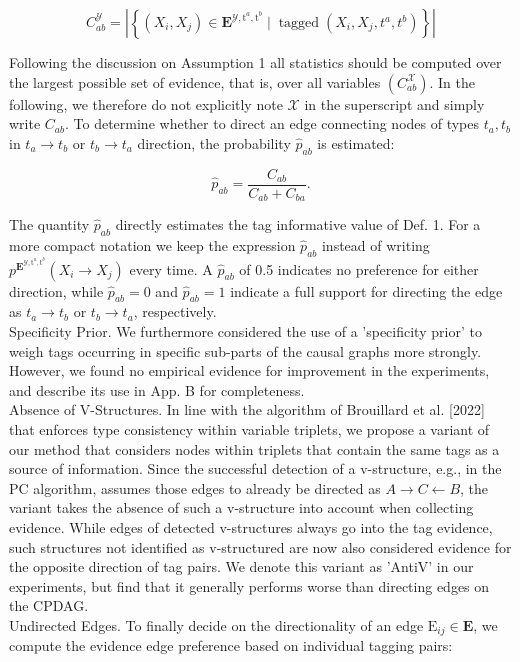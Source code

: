 \documentclass[10pt]{article}
\begin{document}
\begin{equation*}
C_{a b}^{\mathcal{Y}}=\left|\left\{\left(X_{i}, X_{j}\right) \in \mathbf{E}^{\mathcal{Y}, \mathrm{t}^{a}, \mathrm{t}^{b}} \mid \operatorname{tagged}\left(X_{i}, X_{j}, t^{a}, t^{b}\right)\right\}\right| \tag{3}
\end{equation*}


Following the discussion on Assumption 1 all statistics should be computed over the largest possible set of evidence, that is, over all variables $\left(C_{a b}^{\mathcal{X}}\right)$. In the following, we therefore do not explicitly note $\mathcal{X}$ in the superscript and simply write $C_{a b}$. To determine whether to direct an edge connecting nodes of types $t_{a}, t_{b}$ in $t_{a} \rightarrow t_{b}$ or $t_{b} \rightarrow t_{a}$ direction, the probability $\hat{p}_{a b}$ is estimated:


\begin{equation*}
\hat{p}_{a b}=\frac{C_{a b}}{C_{a b}+C_{b a}} . \tag{4}
\end{equation*}


The quantity $\hat{p}_{a b}$ directly estimates the tag informative value of Def. 1. For a more compact notation we keep the expression $\hat{p}_{a b}$ instead of writing $p^{\mathbf{E}^{\mathcal{Y}, \mathrm{t}^{a}, \mathrm{t}^{b}}}\left(X_{i} \rightarrow X_{j}\right)$ every time. A $\hat{p}_{a b}$ of 0.5 indicates no preference for either direction, while $\hat{p}_{a b}=0$ and $\hat{p}_{a b}=1$ indicate a full support for directing the edge as $t_{a} \rightarrow t_{b}$ or $t_{b} \rightarrow t_{a}$, respectively.\\
Specificity Prior. We furthermore considered the use of a 'specificity prior' to weigh tags occurring in specific sub-parts of the causal graphs more strongly. However, we found no empirical evidence for improvement in the experiments, and describe its use in App. B for completeness.\\[0pt]
Absence of V-Structures. In line with the algorithm of Brouillard et al. [2022] that enforces type consistency within variable triplets, we propose a variant of our method that considers nodes within triplets that contain the same tags as a source of information. Since the successful detection of a v-structure, e.g., in the PC algorithm, assumes those edges to already be directed as $A \rightarrow C \leftarrow B$, the variant takes the absence of such a v-structure into account when collecting evidence. While edges of detected v-structures always go into the tag evidence, such structures not identified as v-structured are now also considered evidence for the opposite direction of tag pairs. We denote this variant as 'AntiV' in our experiments, but find that it generally performs worse than directing edges on the CPDAG.\\
Undirected Edges. To finally decide on the directionality of an edge $\mathrm{E}_{i j} \in \mathbf{E}$, we compute the evidence edge preference based on individual tagging pairs:
\end{document}
